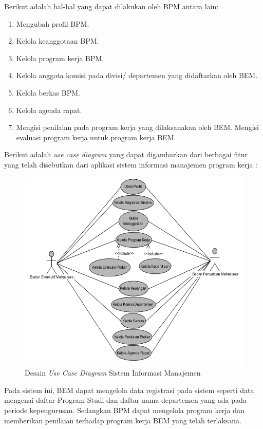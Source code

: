 Berikut adalah hal-hal yang dapat dilakukan oleh BPM antara lain:

\begin{enumerate}
	\item Mengubah profil BPM.
	\item Kelola keanggotaan BPM.
	\item Kelola program kerja BPM.
	\item Kelola anggota komisi pada divisi/ departemen yang didaftarkan oleh BEM.
	\item Kelola berkas BPM.
	\item Kelola agenda rapat.
	\item Mengisi penilaian pada program kerja yang dilaksanakan oleh BEM.
	Mengisi evaluasi program kerja untuk program kerja BEM.
\end{enumerate}

Berikut adalah \emph{use case diagram} yang dapat digambarkan dari berbagai fitur yang telah disebutkan dari aplikasi sistem informasi manajemen program kerja :

\begin{figure}[H]
	\centering
	\includegraphics[width=1.0\textwidth]{gambar/usecase}
	\caption{Desain \emph{Use Case Diagram} Sistem Informasi Manajemen}
	\label{usecase_diagram}
\end{figure}

Pada sistem ini, BEM dapat mengelola data registrasi pada sistem seperti data mengenai daftar Program Studi dan daftar nama departemen yang ada pada periode kepengurusan. Sedangkan BPM dapat mengelola program kerja dan memberikan penilaian terhadap program kerja BEM yang telah terlaksana.

